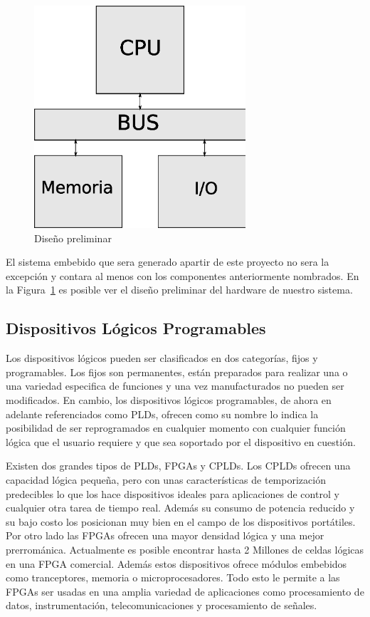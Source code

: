\begin{figure}[h]
  \centering
	\includegraphics[width=0.70\textwidth]{2-sistema/graf/general.eps}
  \caption{Diseño preliminar}
  \label{figu:diseno}
\end{figure}

El sistema embebido que sera generado apartir de este proyecto no sera la excepción y contara al menos con los componentes anteriormente nombrados. En la Figura~\ref{figu:diseno} es posible ver el diseño preliminar del hardware de nuestro sistema.




\subsection{Dispositivos Lógicos Programables}
Los dispositivos lógicos pueden ser clasificados en dos categorías, fijos y programables. Los fijos son permanentes, están preparados para realizar una o una variedad especifica de funciones y una vez manufacturados no pueden ser modificados.
En cambio, los dispositivos lógicos programables, de ahora en adelante referenciados como PLDs, ofrecen como su nombre lo indica la posibilidad de ser reprogramados en cualquier momento con cualquier función lógica que el usuario requiere y que sea soportado por el dispositivo en cuestión.	

Existen dos grandes tipos de PLDs, FPGAs y CPLDs. Los CPLDs ofrecen una capacidad lógica pequeña, pero con unas características de temporización predecibles lo que los hace dispositivos ideales para aplicaciones de control y cualquier otra tarea de tiempo real. Además su consumo de potencia reducido y su bajo costo los posicionan muy bien en el campo de los dispositivos portátiles.
Por otro lado las FPGAs ofrecen una mayor densidad lógica y una mejor prerrománica. Actualmente es posible encontrar hasta 2 Millones de celdas lógicas en una FPGA comercial. Además estos dispositivos ofrece módulos embebidos como tranceptores, memoria o microprocesadores. Todo esto le permite a las FPGAs ser usadas en una amplia variedad de aplicaciones como procesamiento de datos, instrumentación, telecomunicaciones y procesamiento de señales.

